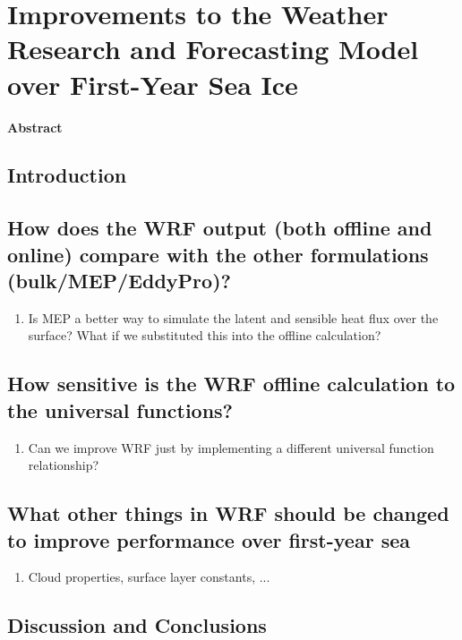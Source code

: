 \chapter{Improvements to the Weather Research and Forecasting Model over First-Year Sea Ice}

\noindent \textbf{Abstract}

\section{Introduction
}
\section{How does the WRF output (both offline and online) compare with the other formulations (bulk/MEP/EddyPro)?}
\begin{enumerate}
    \item Is MEP a better way to simulate the latent and sensible heat flux over the surface? What if we substituted this into the offline calculation?
\end{enumerate} 

\section{How sensitive is the WRF offline calculation to the universal functions?}

\begin{enumerate}
    \item Can we improve WRF just by implementing a different universal function relationship?
\end{enumerate}

\section{What other things in WRF should be changed to improve performance over first-year sea}
\begin{enumerate}
    \item Cloud properties, surface layer constants, ...
\end{enumerate}

\section{Discussion and Conclusions}



